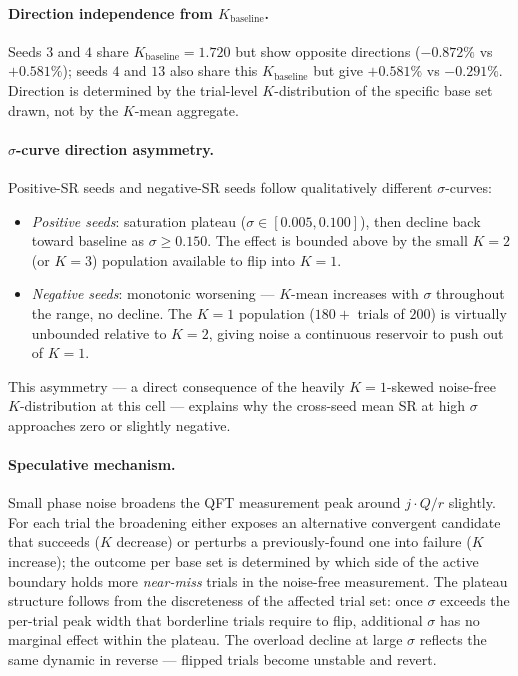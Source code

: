 \documentclass[11pt]{article}
\begin{document}
\paragraph{Direction independence from $K_{\text{baseline}}$.}
Seeds $3$ and $4$ share $K_{\text{baseline}} = 1.720$ but show opposite directions ($-0.872\%$ vs $+0.581\%$); seeds $4$ and $13$ also share this $K_{\text{baseline}}$ but give $+0.581\%$ vs $-0.291\%$. Direction is determined by the trial-level $K$-distribution of the specific base set drawn, not by the $K$-mean aggregate.

\paragraph{$\sigma$-curve direction asymmetry.}
Positive-SR seeds and negative-SR seeds follow qualitatively different $\sigma$-curves:
\begin{itemize}
  \item \emph{Positive seeds}: saturation plateau ($\sigma \in [0.005, 0.100]$), then decline back toward baseline as $\sigma \geq 0.150$. The effect is bounded above by the small $K = 2$ (or $K = 3$) population available to flip into $K = 1$.
  \item \emph{Negative seeds}: monotonic worsening --- $K$-mean increases with $\sigma$ throughout the range, no decline. The $K = 1$ population ($180+$ trials of $200$) is virtually unbounded relative to $K = 2$, giving noise a continuous reservoir to push out of $K = 1$.
\end{itemize}
This asymmetry --- a direct consequence of the heavily $K = 1$-skewed noise-free $K$-distribution at this cell --- explains why the cross-seed mean SR at high $\sigma$ approaches zero or slightly negative.

\paragraph{Speculative mechanism.}
Small phase noise broadens the QFT measurement peak around $j \cdot Q / r$ slightly. For each trial the broadening either exposes an alternative convergent candidate that succeeds ($K$ decrease) or perturbs a previously-found one into failure ($K$ increase); the outcome per base set is determined by which side of the active boundary holds more \emph{near-miss} trials in the noise-free measurement. The plateau structure follows from the discreteness of the affected trial set: once $\sigma$ exceeds the per-trial peak width that borderline trials require to flip, additional $\sigma$ has no marginal effect within the plateau. The overload decline at large $\sigma$ reflects the same dynamic in reverse --- flipped trials become unstable and revert.
\end{document}
